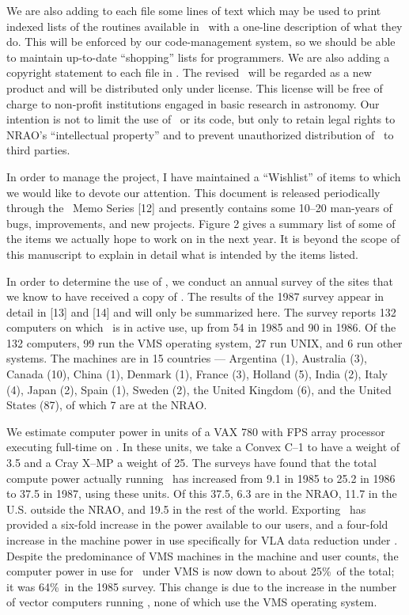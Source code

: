     We are also adding to each file some lines of text which may be
used to print indexed lists of the routines available in \AIPS\ with
a one-line description of what they do.  This will be enforced by our
code-management system, so we should be able to maintain up-to-date
``shopping'' lists for programmers.  We are also adding a copyright
statement to each file in \AIPS.  The revised \AIPS\ will be regarded
as a new product and will be distributed only under license.  This
license will be free of charge to non-profit institutions engaged in
basic research in astronomy.  Our intention is not to limit the use
of \AIPS\ or its code, but only to retain legal rights to NRAO's
``intellectual property'' and to prevent unauthorized distribution
of \AIPS\ to third parties.


     In order to manage the project, I have maintained a ``Wishlist''
of items to which we would like to devote our attention.  This document
is released periodically through the \AIPS\ Memo Series [12] and
presently contains some 10--20 man-years of bugs, improvements, and
new projects.  Figure 2 gives a summary list of some of the items
we actually hope to work on in the next year.  It is beyond the scope
of this manuscript to explain in detail what is intended by the
items listed.



     In order to determine the use of \AIPS, we conduct an annual
survey of the sites that we know to have received a copy of \AIPS.
The results of the 1987 survey appear in detail in [13] and [14]
and will only be summarized here.  The survey reports 132 computers
on which \AIPS\ is in active use, up from 54 in 1985 and
90 in 1986.  Of the 132 computers, 99 run the VMS operating system,
27 run UNIX, and 6 run other systems.  The machines are in
15 countries --- Argentina (1), Australia (3), Canada (10), China
(1), Denmark (1), France (3), Holland (5), India (2), Italy (4),
Japan (2), Spain (1), Sweden (2), the United Kingdom (6), and the
United States (87), of which 7 are at the \hbox{NRAO}.

     We estimate computer power in units of a VAX 780 with FPS
array processor executing full-time on \AIPS.  In these units, we
take a Convex C--1 to have a weight of 3.5 and a Cray X--MP a weight
of 25.  The surveys have found that the total compute power
actually running \AIPS\ has increased from 9.1 in 1985 to 25.2 in
1986 to 37.5 in 1987, using these units.  Of this 37.5, 6.3
are in the NRAO, 11.7 in the U.S. outside the NRAO, and 19.5 in
the rest of the world.  Exporting \AIPS\ has provided a six-fold
increase in the power available to our users, and a four-fold
increase in the machine power in use specifically for VLA data
reduction under \AIPS.  Despite the predominance of VMS machines
in the machine and user counts, the computer power in use for
\AIPS\ under VMS is now down to about 25\%\ of the total; it
was 64\%\ in the 1985 survey.  This change is due to the increase
in the number of vector computers running \AIPS, none of which use
the VMS operating system.

